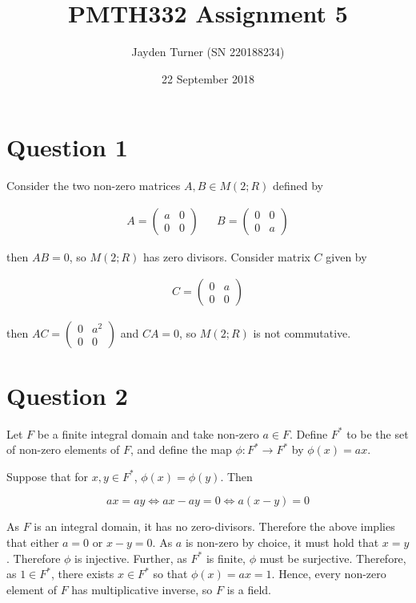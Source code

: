 \documentclass{article}
\title{PMTH332 Assignment 5}
\date{22 September 2018}
\author{Jayden Turner (SN 220188234)}
\begin{document}
\maketitle
{}

\section*{Question 1}

Consider the two non-zero matrices $A, B \in M(2; R)$ defined by

\begin{align*}
    A = \begin{pmatrix}
        a & 0\\
        0 & 0
    \end{pmatrix}
    &&
    B = \begin{pmatrix}
        0 & 0\\
        0 & a
    \end{pmatrix}
\end{align*}

then $AB = 0$, so $M(2; R)$ has zero divisors. Consider matrix $C$ given by

\begin{align*}
    C = \begin{pmatrix}
        0 & a\\
        0 & 0
    \end{pmatrix}
\end{align*}

then $AC = \begin{pmatrix}0 & a^2\\0 & 0\end{pmatrix}$ and $CA = 0$,
so $M(2; R)$ is not commutative.

\section*{Question 2}

Let $F$ be a finite integral domain and take non-zero $a \in F$. Define $F^*$
to be the set of non-zero elements of $F$, and define the map $\phi: F^* \to F^*$
by $\phi(x) = ax$.

\hfill\break
Suppose that for $x, y \in F^*$, $\phi(x) = \phi(y)$. Then

\begin{equation*}
    ax = ay \iff ax - ay = 0 \iff a(x - y) = 0
\end{equation*}

As $F$ is an integral domain, it has no zero-divisors. Therefore the above
implies that either $a = 0$ or $x - y = 0$. As $a$ is non-zero by choice,
it must hold that $x = y$. Therefore $\phi$ is injective. Further, as $F^*$
is finite, $\phi$ must be surjective. Therefore, as $1 \in F^*$, there
exists $x \in F^*$ so that $\phi(x) = ax = 1$. Hence, every non-zero element
of $F$ has multiplicative inverse, so $F$ is a field.
\end{document}
